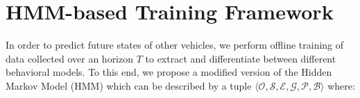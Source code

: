\documentclass[letterpaper, 10 pt, conference]{ieeeconf}  %
\newcommand\NB[1]{$\spadesuit$\footnote{NB: #1}}
\begin{document}


\section{HMM-based Training Framework} \label{sec:fmwk}
 In order to predict future states of other vehicles, we perform offline training of data collected over an horizon $T$ to extract and differentiate between different behavioral models. To this end, we propose a modified version of the Hidden Markov Model (HMM) \cite{woohmm} which can be described by a tuple $\langle \mathcal{O},\mathcal{S},\mathcal{E},\mathcal{G},\mathcal{P},\mathcal{B} \rangle$  where:
\end{document}
